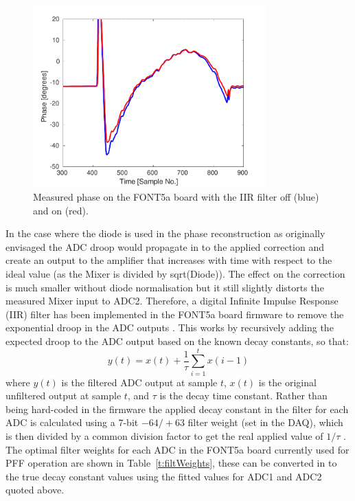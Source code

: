 \begin{figure}
  \centering
  \includegraphics[width=0.8\textwidth]{Figures/commissioning/iirPhaseFiltOffOn}
  \caption{Measured phase on the FONT5a board with the IIR filter off (blue) and on (red).}
  \label{f:iirPhasefiltOffOn}
\end{figure}


In the case where the diode is used in the phase reconstruction as originally envisaged the ADC droop would propagate in to the applied correction and create an output to the amplifier that increases with time with respect to the ideal value (as the Mixer is divided by sqrt(Diode)). The effect on the correction is much smaller without diode normalisation but it still slightly distorts the measured Mixer input to ADC2. Therefore, a digital Infinite Impulse Response (IIR) filter has been implemented in the FONT5a board firmware to remove the exponential droop in the ADC outputs \cite{glennCLIC14}. This works by recursively adding the expected droop to the ADC output based on the known decay constants, so that:
\begin{equation}
y(t) = x(t) + \frac{1}{\tau} \sum_{i=1}^{t} x(i-1)
\end{equation}
\label{e:iirFilt}
\hspace{-0.3cm} where \(y(t)\) is the filtered ADC output at sample \(t\), \(x(t)\) is the original unfiltered output at sample \(t\), and \(\tau\) is the decay time constant. Rather than being hard-coded in the firmware the applied decay constant in the filter for each ADC is calculated using a 7-bit \(-64/+63\) filter weight (set in the DAQ), which is then divided by a common division factor to get the real applied value of \(1/\tau\) \cite{glennPriv}. The optimal filter weights for each ADC in the FONT5a board currently used for PFF operation are shown in Table~\ref{t:filtWeights}, these can be converted in to the true decay constant values using the fitted values for ADC1 and ADC2 quoted above.

